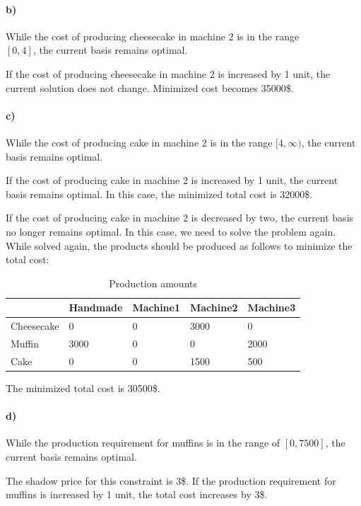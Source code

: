 \documentclass{article}
\begin{document}
\paragraph*{b)}
While the cost of producing cheesecake in machine 2 is in the range\\$[0, 4]$, the current basis remains optimal.

If the cost of producing cheesecake in machine 2 is increased by 1 unit, the current solution does not change. Minimized cost becomes 35000\$.

\paragraph*{c)}
While the cost of producing cake in machine 2 is in the range $[4, \infty)$, the current basis remains optimal.

If the cost of producing cake in machine 2 is increased by 1 unit, the current basis remains optimal. In this case, the minimized total cost is 32000\$.

If the cost of producing cake in machine 2 is decreased by two, the current basis no longer remains optimal. In this case, we need to solve the problem again.
While solved again, the products should be produced as follows to minimize the total cost:
\begin{table}[H]
    \centering
    \caption{Production amounts}
    \begin{tabular}{|l|l|l|l|l|}
    \hline
               & Handmade & Machine1 & Machine2 & Machine3 \\ \hline
    Cheesecake & 0        & 0        & 3000     & 0        \\ \hline
    Muffin     & 3000     & 0        & 0        & 2000     \\ \hline
    Cake       & 0        & 0        & 1500     & 500      \\ \hline
    \end{tabular}
    \end{table}
The minimized total cost is 30500\$.

\paragraph*{d)}
While the production requirement for muffins is in the range of $[0, 7500]$, the current basis remains optimal.

The shadow price for this constraint is 3\$.
If the production requirement for muffins is increased by 1 unit, the total cost increases by 3\$.
\end{document}

